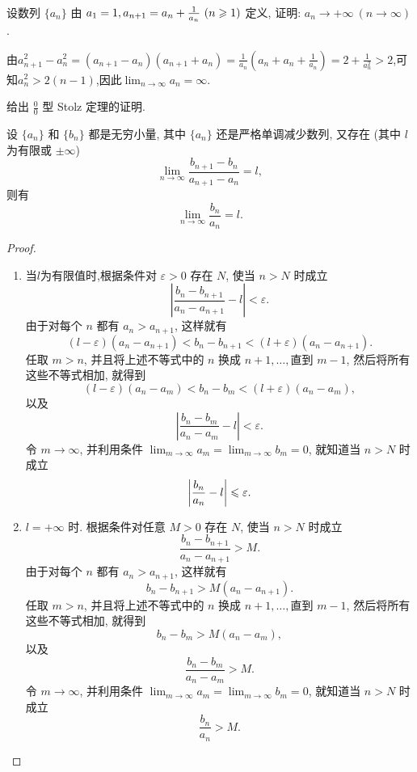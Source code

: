 \begin{exercise}[1.2.25]
    设数列 $\{a_n\}$ 由 $a_1 = 1, a_{n+1} = a_n + \frac{1}{a_n} \ (n \ges 1)$ 定义, 证明: $a_n \to +\infty \ (n \to \infty)$.
\end{exercise}

\begin{solution}
    由$a_{n+1}^2 - a_n^2 = (a_{n+1} - a_n)(a_{n+1} + a_n) = \frac{1}{a_n}(a_n + a_n + \frac{1}{a_n}) = 2 + \frac{1}{a_n^2} > 2$,可知$a_n^2 > 2(n-1)$,因此$\lim_{n\to\infty} a_n = \infty$.
\end{solution}

\begin{exercise}[1.2.26]
    给出 $\frac{0}{0}$ 型 Stolz 定理的证明.
\end{exercise}

\begin{proposition*}
    设 $\{a_n\}$ 和 $\{b_n\}$ 都是无穷小量, 其中 $\{a_n\}$ 还是严格单调减少数列, 又存在 (其中 $l$ 为有限或 $\pm\infty$)
    $$ \lim_{n \to \infty} \frac{b_{n+1}-b_n}{a_{n+1}-a_n} = l, $$
    则有
    $$ \lim_{n \to \infty} \frac{b_n}{a_n} = l. $$
\end{proposition*}

\begin{proof}
    \begin{enumerate}[(1)]
        \item 当$l$为有限值时,根据条件对 $\varepsilon > 0$ 存在 $N$, 使当 $n > N$ 时成立
              $$ \left|\frac{b_n-b_{n+1}}{a_n-a_{n+1}} - l \right| < \varepsilon. $$
              由于对每个 $n$ 都有 $a_n > a_{n+1}$, 这样就有
              $$ (l-\varepsilon)(a_n-a_{n+1}) < b_n - b_{n+1} < (l+\varepsilon)(a_n-a_{n+1}). $$
              任取 $m>n$, 并且将上述不等式中的 $n$ 换成 $n+1, \dots, \text{直到 } m-1$, 然后将所有这些不等式相加, 就得到
              $$ (l-\varepsilon)(a_n-a_m) < b_n - b_m < (l+\varepsilon)(a_n-a_m), $$
              以及
              $$ \left|\frac{b_n-b_m}{a_n-a_m} - l \right| < \varepsilon. $$
              令 $m \to \infty$, 并利用条件 $\lim_{m \to \infty} a_m = \lim_{m \to \infty} b_m = 0$, 就知道当 $n>N$ 时成立
              $$ \left|\frac{b_n}{a_n} - l \right| \leqslant \varepsilon. $$
        \item $l = +\infty$ 时. 根据条件对任意 $M > 0$ 存在 $N$, 使当 $n > N$ 时成立
              $$ \frac{b_n-b_{n+1}}{a_n-a_{n+1}} > M. $$
              由于对每个 $n$ 都有 $a_n > a_{n+1}$, 这样就有
              $$ b_n - b_{n+1} > M(a_n-a_{n+1}). $$
              任取 $m>n$, 并且将上述不等式中的 $n$ 换成 $n+1, \dots, \text{直到 } m-1$, 然后将所有这些不等式相加, 就得到
              $$ b_n - b_m > M(a_n-a_m), $$
              以及
              $$ \frac{b_n-b_m}{a_n-a_m} > M. $$
              令 $m \to \infty$, 并利用条件 $\lim_{m \to \infty} a_m = \lim_{m \to \infty} b_m = 0$, 就知道当 $n>N$ 时成立
              $$ \frac{b_n}{a_n} > M.  $$
    \end{enumerate}
\end{proof}